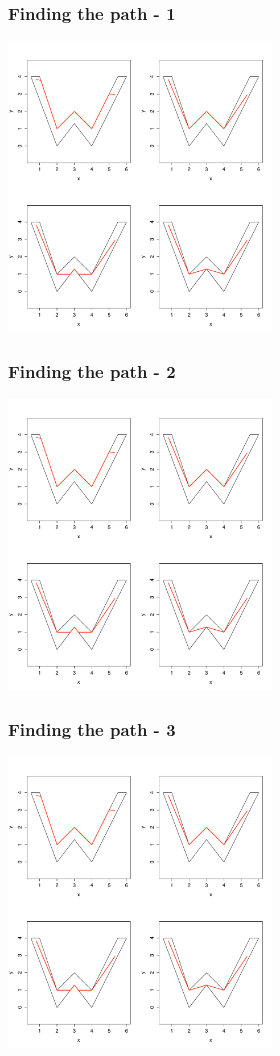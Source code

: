 \documentclass[ignorenonframetext]{beamer} %
\begin{document}
\begin{frame}
	\frametitle{Finding the path - 1}
            \centering
              \includegraphics[width=2.75in]{figs/wood-2}\\
\end{frame}

\begin{frame}
	\frametitle{Finding the path - 2}
            \centering
              \includegraphics[width=2.75in]{figs/wood-1}\\
\end{frame}

\begin{frame}
	\frametitle{Finding the path - 3}
            \centering
              \includegraphics[width=2.75in]{figs/wood-3}\\
\end{frame}
\end{document}
